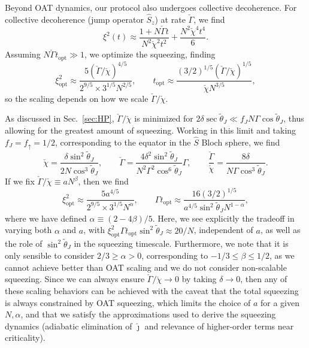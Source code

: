 Beyond OAT dynamics, our protocol also undergoes collective decoherence. For collective decoherence (jump operator $\hat{S}_z$) at rate $\check{\Gamma}$, we find \cite{Schleier-Smith2010,Lewis-Swan2018,Chu2021,Baamara2022}
\begin{equation}
    \xi^2(t) \approx \frac{1 + N \check{\Gamma} t}{N^2 \check{\chi}^2 t^2} + \frac{N^2 \check{\chi}^4 t^4}{6}.
\end{equation}
Assuming $N \check \Gamma t_{\text{opt}} \gg 1$, we optimize the squeezing, finding
\begin{equation}
    \xi^2_{\text{opt}} \approx \frac{5 (\check{\Gamma}/\check{\chi})^{4/5}}{2^{9/5}\times 3^{1/5}N^{2/5}}, \qquad t_{\text{opt}} \approx \frac{(3/2)^{1/5}(\check \Gamma/ \check \chi)^{1/5}}{\check \chi N^{3/5}},
\end{equation}
so the scaling depends on how we scale $\check \Gamma/\check \chi$. 

As discussed in Sec.~\ref{sec:HP}, $\check \Gamma/\check \chi$ is minimized for $2 \delta \sec \tilde{\theta}_J \ll f_J N \Gamma \cos \tilde{\theta}_J$, thus allowing for the greatest amount of squeezing. Working in this limit and taking $f_J = f_{\uparrow} = 1/2$, corresponding to the equator in the $\hat S$ Bloch sphere, we find
\begin{equation}
    \check{\chi} = \frac{ \delta \sin^2 \tilde{\theta}_J}{2 N \cos^3 \tilde{\theta}_J}, \qquad \check{\Gamma} = \frac{4 \delta^2 \sin^2 \tilde{\theta}_J}{N^2 \Gamma^2 \cos^6 \tilde{\theta}_J} \Gamma, \qquad \frac{\check{\Gamma}}{\check{\chi}} = \frac{8 \delta}{N \Gamma \cos^3 \tilde{\theta}_J}.
\end{equation}
If we fix $\check \Gamma/\check \chi \equiv a N^\beta$, then we find
\begin{equation}
    \xi^2_{\text{opt}} \approx \frac{ 5 a^{4/5}}{2^{9/5} \times 3^{1/5} N^{\alpha}}, \qquad \Gamma t_{\text{opt}} \approx \frac{16 (3/2)^{1/5}}{a^{4/5} \sin^2 \tilde{\theta}_J N^{1-\alpha}},
\end{equation}
where we have defined $\alpha \equiv (2-4 \beta)/5$. Here, we see explicitly the tradeoff in varying both $\alpha$ and $a$, with $\xi^2_{\text{opt}} \Gamma t_{\text{opt}} \sin^2 \tilde{\theta}_J \approx 20/N$, independent of $a$, as well as the role of $\sin^2 \tilde{\theta}_J$ in the squeezing timescale. Furthermore, we note that it is only sensible to consider $2/3 \geq \alpha > 0$, corresponding to $ -1/3 \leq \beta \leq 1/2$, as we cannot achieve better than OAT scaling and we do not consider non-scalable squeezing. Since we can always ensure $\check \Gamma/\check \chi \to 0$ by taking $\delta \to 0$, then any of these scaling behaviors can be achieved with the caveat that the total squeezing is always constrained by OAT squeezing, which limits the choice of $a$ for a given $N, \alpha$, and that we satisfy the approximations used to derive the squeezing dynamics (adiabatic elimination of $\hat \jmath$ and relevance of higher-order terms near criticality). 

